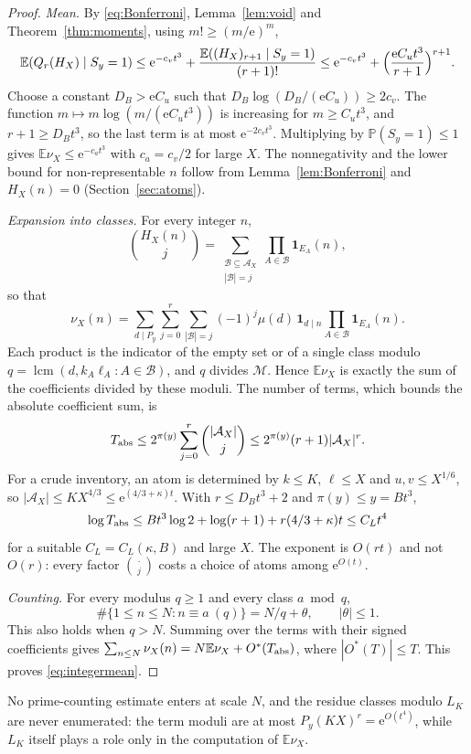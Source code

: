 \documentclass[10pt,reqno]{amsart}
\theoremstyle{remark}
\newcommand{\A}{\mathcal A}
\newcommand{\E}{\mathbb E}
\newcommand{\Prob}{\mathbb P}
\newcommand{\ind}{\mathbf1}
\newcommand{\lcm}{\operatorname{lcm}}
\newcommand{\e}{\mathrm e}
\begin{document}
\begin{proof}
\emph{Mean.}  By \eqref{eq:Bonferroni}, Lemma~\ref{lem:void} and
Theorem~\ref{thm:moments}, using $m!\geq(m/\e)^m$,
\[
 \E(Q_r(H_X)\mid S_y=1)\leq\e^{-c_vt^3}
 +\frac{\E((H_X)_{r+1}\mid S_y=1)}{(r+1)!}
 \leq\e^{-c_vt^3}+\Bigl(\frac{\e C_ut^3}{r+1}\Bigr)^{r+1}.
\]
Choose a constant $D_B>\e C_u$ such that
$D_B\log(D_B/(\e C_u))\geq2c_v$.  The function
$m\mapsto m\log(m/(\e C_ut^3))$ is increasing for $m\geq C_ut^3$, and
$r+1\geq D_Bt^3$, so the last term is at most $\e^{-2c_vt^3}$.
Multiplying by $\Prob(S_y=1)\leq1$ gives $\E\nu_X\leq\e^{-c_at^3}$ with
$c_a=c_v/2$ for large $X$.  The
nonnegativity and the lower bound for non-representable $n$ follow from
Lemma~\ref{lem:Bonferroni} and $H_X(n)=0$ (Section~\ref{sec:atoms}).

\emph{Expansion into classes.}  For every integer $n$,
\[
 \binom{H_X(n)}j=\sum_{\substack{\mathcal B\subseteq\A_X\\|\mathcal B|=j}}
 \prod_{A\in\mathcal B}\ind_{E_A}(n),
\]
so that
\[
 \nu_X(n)=\sum_{d\mid P_y}\sum_{j=0}^r\sum_{|\mathcal B|=j}
 (-1)^j\mu(d)\,\ind_{d\mid n}\prod_{A\in\mathcal B}\ind_{E_A}(n).
\]
Each product is the indicator of the empty set or of a single class
modulo $q=\lcm(d,k_A\ell_A:A\in\mathcal B)$, and $q$ divides $\mathcal M$.
Hence $\E\nu_X$ is exactly the sum of the coefficients divided by these
moduli.  The number of terms, which bounds the absolute coefficient sum, is
\[
 T_{\rm abs}\leq2^{\pi(y)}\sum_{j=0}^r\binom{|\A_X|}j
 \leq2^{\pi(y)}(r+1)|\A_X|^r .
\]
For a crude inventory, an atom is determined by $k\leq K$, $\ell\leq X$
and $u,v\leq X^{1/6}$, so $|\A_X|\leq KX^{4/3}\leq\e^{(4/3+\kappa)t}$.
With $r\leq D_Bt^3+2$ and $\pi(y)\leq y=Bt^3$,
\begin{equation}\label{eq:termcount}
 \log T_{\rm abs}\leq Bt^3\log2+\log(r+1)+r(4/3+\kappa)t\leq C_Lt^4
\end{equation}
for a suitable $C_L=C_L(\kappa,B)$ and large $X$.  The exponent is
$O(rt)$ and not $O(r)$: every factor $\binom{\cdot}{j}$ costs a choice
of atoms among $\e^{O(t)}$.

\emph{Counting.}  For every modulus $q\geq1$ and every class $a\bmod q$,
\[
 \#\{1\leq n\leq N:n\equiv a\ (q)\}=N/q+\theta,\qquad|\theta|\leq1 .
\]
This also holds when $q>N$.  Summing over the terms with their signed
coefficients gives
$\sum_{n\leq N}\nu_X(n)=N\E\nu_X+O^*(T_{\rm abs})$, where $|O^*(T)|\leq T$.
This proves \eqref{eq:integermean}.
\end{proof}
No prime-counting estimate enters at scale $N$, and the residue classes
modulo $L_K$ are never enumerated: the term moduli are at most
$P_y(KX)^r=\e^{O(t^4)}$, while $L_K$ itself plays a role only in the
computation of $\E\nu_X$.
\end{document}
